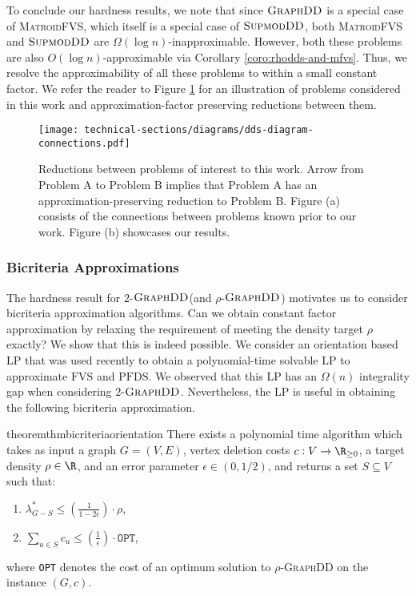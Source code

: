 \documentclass{article}
\newcommand{\mfvs}{\textsc{MatroidFVS}\xspace}
\newcommand{\densitydeletionset}{\textsc{GraphDD}\xspace}
\newcommand{\rhodensitydeletionset}{\ensuremath{\rho\text{-}}\densitydeletionset\xspace}
\newcommand{\dds}{\ensuremath{\textsc{GraphDD}}\xspace}
\newcommand{\pfds}{\ensuremath{\text{PFDS}}\xspace}
\newcommand{\fvs}{\ensuremath{\text{FVS}}\xspace}
\newcommand{\sdds}{\ensuremath{\textsc{SupmodDD}}\xspace}
\begin{document}
To conclude our hardness results, we note that since \dds is a special case of  \mfvs, which itself is a special case of \sdds,
 both \mfvs and \sdds are $\Omega(\log n)$-inapproximable. However, both these problems are also $O(\log{n})$-approximable via 
Corollary \ref{coro:rhodds-and-mfvs}. 
Thus, we resolve the approximability of all these problems to within a small constant factor. 
We refer the reader to Figure \ref{fig:reductions} for an illustration of problems considered in this work and approximation-factor preserving reductions between them. 
\fi

\begin{figure}[ht]
\centering
\texttt{[image: technical-sections/diagrams/dds-diagram-connections.pdf]}
\caption{Reductions between problems of interest to this work. Arrow from Problem A to Problem B implies that Problem A has an approximation-preserving reduction to Problem B. Figure (a) consists of the connections between problems known prior to our work. Figure (b) showcases our results.}
\label{fig:reductions}
\end{figure}


\subsubsection{Bicriteria Approximations}
The hardness result for $2$-\dds (and $\rho$-\dds) motivates us to consider bicriteria approximation algorithms. Can we obtain constant factor approximation by relaxing the requirement of meeting the density target $\rho$ exactly? We show that this is indeed possible.
We consider an orientation based  LP that was used recently to obtain a polynomial-time solvable LP to approximate \fvs and \pfds \cite{chandrasekaran2024polyhedralaspectsfeedbackvertex}.
We observed that this LP has an $\Omega(n)$ integrality gap when considering $2$-\dds. Nevertheless, the LP is useful in obtaining the following bicriteria approximation.

\begin{restatable}{theorem}{thmbicriteriaorientation}\label{thm:orientation-LP-bicriteria}
    There exists a polynomial time algorithm which takes as input a graph $G = (V, E)$, vertex deletion costs $c:V\rightarrow\R_{\ge 0}$, a target density $\rho\in \R$, and an error parameter $\epsilon \in (0, 1/2)$, and returns a set $S\subseteq V$ such that:
    \begin{enumerate}
        \item $\lambda^*_{G - S} \leq \left(\frac{1}{1 - 2\epsilon}\right) \cdot \rho$,
        \item $\sum_{u\in S}c_u \leq \left(\frac{1}{\epsilon}\right) \cdot \mathtt{OPT}$,
    \end{enumerate}
    where \texttt{OPT} denotes the cost of an optimum solution to \rhodensitydeletionset on the instance $(G,c)$.
\end{restatable}
\end{document}
